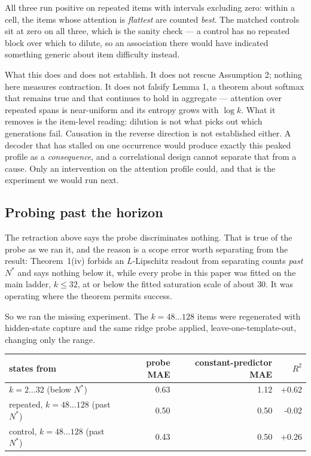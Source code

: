 \documentclass[11pt]{article}
\begin{document}
All three run positive on repeated items with intervals excluding zero: within a
cell, the items whose attention is \emph{flattest} are counted \emph{best}. The
matched controls sit at zero on all three, which is the sanity check --- a
control has no repeated block over which to dilute, so an association there would
have indicated something generic about item difficulty instead.

What this does and does not establish. It does not rescue Assumption 2; nothing
here measures contraction. It does not falsify Lemma 1, a theorem about softmax
that remains true and that continues to hold in aggregate --- attention over
repeated spans is near-uniform and its entropy grows with $\log k$. What it
removes is the item-level reading: dilution is not what picks out which
generations fail. Causation in the reverse direction is not established either. A
decoder that has stalled on one occurrence would produce exactly this peaked
profile as a \emph{consequence}, and a correlational design cannot separate that
from a cause. Only an intervention on the attention profile could, and that is
the experiment we would run next.


\subsection{Probing past the horizon}

The retraction above says the probe discriminates nothing. That is true of the
probe as we ran it, and the reason is a scope error worth separating from the
result: Theorem~1(iv) forbids an $L$-Lipschitz readout from separating counts
\emph{past} $N^\ast$ and says nothing below it, while every probe in this paper
was fitted on the main ladder, $k\le32$, at or below the fitted saturation scale
of about $30$. It was operating where the theorem permits success.

So we ran the missing experiment. The $k=48\ldots128$ items were regenerated with
hidden-state capture and the same ridge probe applied, leave-one-template-out,
changing only the range.

\begin{center}
\begin{tabular}{lrrr}
\toprule
states from & probe MAE & constant-predictor MAE & $R^2$ \\
\midrule
$k=2\ldots32$ (below $N^\ast$)   & 0.63 & 1.12 & +0.62 \\
repeated, $k=48\ldots128$ (past $N^\ast$)  & 0.50 & 0.50 & -0.02 \\
control, $k=48\ldots128$ (past $N^\ast$)   & 0.43 & 0.50 & +0.26 \\
\bottomrule
\end{tabular}
\end{center}
\end{document}
